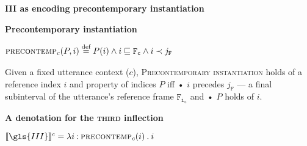 \begin{shaded}
\pex\textbf{\gls{III} as encoding precontemporary instantiation}\label{denoteIII}

\a\textbf{Precontemporary instantiation}

$\begin{aligned}\textsc{precontemp}_{c}(P,i)\overset{\text{def}}{=}\iffalse\quad\&\textsc{NfInst}(P,\mathtt{F},j_{\mathtt{F}})\\\fi
P(i)\wedge i\sqsubseteq\mathtt{F_c}\wedge i\prec j_{\mathtt{F}}\end{aligned}$


Given a fixed utterance context ($ c $), \textsc{Precontemporary instantiation} holds of a reference index $ i $ and property of indices $ P $ iff • $ i $ precedes $ j_{\mathtt{F}} $ --- a final subinterval of the utterance's reference frame $ \mathtt{F_{i_c}} $ and • $ P $ holds of $ i $.

\a \textbf{A denotation for the \textsc{third} inflection}

$\denote[c]{\gls{III}}=\lambda i\mathbin{:}\textsc{precontemp}_c(i)\mathbin.i$

\xe

\end{shaded}





%
%
%





